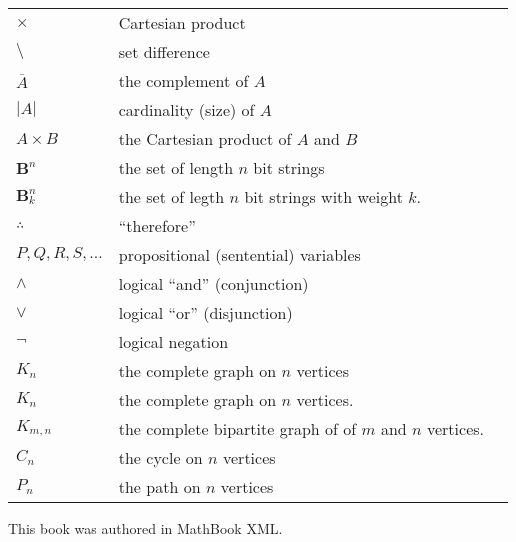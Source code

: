 \documentclass[12pt,]{book}
\theoremstyle{plain}
\theoremstyle{definition}
\theoremstyle{definition}
\theoremstyle{definition}
\numberwithin{equation}{chapter}
\newcommand{\B}{\mathbf B}
\renewcommand{\bar}{\overline}
\newcommand{\card}[1]{\left| #1 \right|}
\begin{document}
\begin{longtable}[l]{lp{}r}
\(\times\)&Cartesian product&\pageref{notation-21}\\
\(\setminus\)&set difference&\pageref{notation-22}\\
\(\bar{A}\)&the complement of \(A\)&\pageref{notation-23}\\
\(\card{A}\)&cardinality (size) of \(A\)&\pageref{notation-24}\\
\(A\times B\)&the Cartesian product of \(A\) and \(B\)&\pageref{notation-25}\\
\(\B^n\)&the set of length \(n\) bit strings&\pageref{notation-26}\\
\(\B^n_k\)&the set of legth \(n\) bit strings with weight \(k\).&\pageref{notation-27}\\
\(\therefore\)&``therefore''&\pageref{notation-28}\\
\(P, Q, R, S, \ldots\)&propositional (sentential) variables&\pageref{notation-29}\\
\(\wedge\)&logical ``and'' (conjunction)&\pageref{notation-30}\\
\(\vee\)&logical ``or'' (disjunction)&\pageref{notation-31}\\
\(\neg\)&logical negation&\pageref{notation-32}\\
\(K_n\)&the complete graph on \(n\) vertices&\pageref{notation-33}\\
\(K_n\)&the complete graph on \(n\) vertices.&\pageref{notation-34}\\
\(K_{m,n}\)&the complete bipartite graph of of \(m\) and \(n\) vertices.&\pageref{notation-35}\\
\(C_n\)&the cycle on \(n\) vertices&\pageref{notation-36}\\
\(P_n\)&the path on \(n\) vertices&\pageref{notation-37}\\
\end{longtable}
%
\backmatter
%
%
\renewcommand{\leftmark}{Index}
\printindex
%
\cleardoublepage
\pagestyle{empty}
\hypertarget{colophon-2}{}
\centerline{\hypertarget{p-1723}{}%
This book was authored in MathBook XML.%
}
\end{document}
